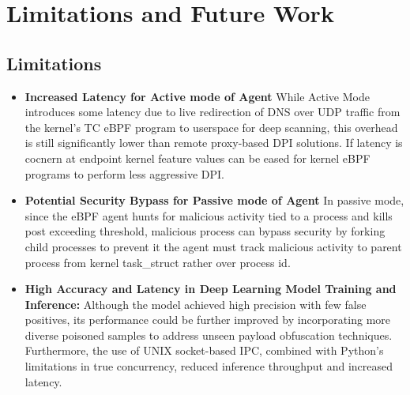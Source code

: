 \documentclass [11pt, proquest] {uwthesis}[2020/02/24]
\begin{document}
\section*{Limitations and Future Work}

\subsection*{Limitations}

\begin{itemize}[nosep]

    \item \textbf{Increased Latency for Active mode of Agent}
     While Active Mode introduces some latency due to live redirection of DNS over UDP traffic from the kernel’s TC eBPF program to userspace for deep scanning, this overhead is still significantly lower than remote proxy-based DPI solutions. If latency is cocnern at endpoint kernel feature values can be eased for kernel eBPF programs to perform less aggressive DPI.

    \item \textbf{Potential Security Bypass for Passive mode of Agent}
    In passive mode, since the eBPF agent hunts for malicious activity tied to a process and kills post exceeding threshold, malicious process can bypass security by forking child processes to prevent it the agent must track malicious activity to parent process from kernel task\_struct rather over process id.

    \item \textbf{High Accuracy and Latency in Deep Learning Model Training and Inference:} Although the model achieved high precision with few false positives, its performance could be further improved by incorporating more diverse poisoned samples to address unseen payload obfuscation techniques. Furthermore, the use of UNIX socket-based IPC, combined with Python's limitations in true concurrency, reduced inference throughput and increased latency.


\end{itemize}
\end{document}
